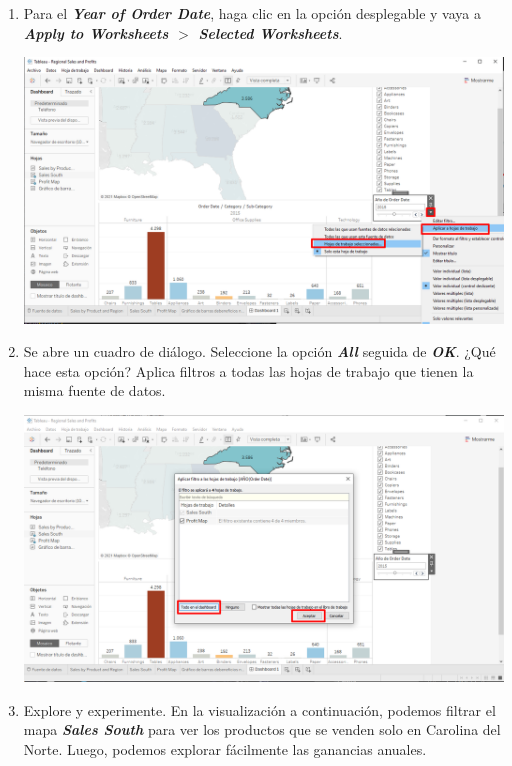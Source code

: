 \documentclass[12pt,letterpaper]{article}
\begin{document}
\begin{enumerate}
\begin{center}
        \end{center}
        \item Para el \textit{\textbf{Year of Order Date}}, haga clic en la opción desplegable y vaya a \textit{\textbf{Apply to Worksheets $>$ Selected Worksheets}}.
        \begin{center}
            \includegraphics[width=15cm]{./img/img83.png}
        \end{center}
        \item Se abre un cuadro de diálogo. Seleccione la opción \textit{\textbf{All}} seguida de \textit{\textbf{OK}}. ¿Qué hace esta opción? Aplica filtros a todas las hojas de trabajo que tienen la misma fuente de datos.
        \begin{center}
            \includegraphics[width=15cm]{./img/img84.png}
        \end{center}
        \item Explore y experimente. En la visualización a continuación, podemos filtrar el mapa \textit{\textbf{Sales South}} para ver los productos que se venden solo en Carolina del Norte. Luego, podemos explorar fácilmente las ganancias anuales.

\end{enumerate}
\end{document}
